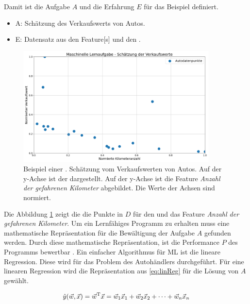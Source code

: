 Damit ist die Aufgabe \(A\) und die Erfahrung \(E\) für das Beispiel definiert. 

\begin{itemize}
    \item A: Schätzung des Verkaufswerts von Autos.
    \item E: Datensatz aus den \gls{Feature}[s] und den .
\end{itemize}

\begin{figure}[htb]
    \centering
    \includegraphics[width=0.9\textwidth]{img/Autohändlerbsp/Schätzung der Verkaufswerte.png}
    \caption[Beispiel einer maschinellen Lernaufgabe.]{Beispiel einer . Schätzung vom Verkaufswerten von Autos. Auf der y-Achse ist der  dargestellt. Auf der y-Achse ist die \gls{Feature} \textit{Anzahl der gefahrenen Kilometer} abgebildet. Die Werte der Achsen sind normiert.}
    \label{fig:BspMLAuto}
\end{figure}


Die Abbildung \ref{fig:BspMLAuto} zeigt die die Punkte in \(D\) für den  und das \gls{Feature} \textit{Anzahl der gefahrenen Kilometer}. Um ein Lernfähiges Programm zu erhalten muss eine mathematische Repräsentation für die Bewältigung der Aufgabe \(A\) gefunden werden. Durch diese mathematische Repräsentation, ist die Performance \(P\) des Programms bewertbar \cite{Mitchell.1997}. Ein einfacher Algorithmus für \gls{ML} ist die lineare Regression. Diese wird für das Problem des Autohändlers durchgeführt. Für eine linearen Regression wird die Repräsentation aus \autoref{eq:linReg} für die Lösung von \(A\) gewählt.

\begin{equation}
    \label{eq:linReg}
    \hat{y}(\vec{w}, \vec{x}) =  \vec{w}^\mathrm{T}\vec{x} = \vec{w}_1\vec{x}_1 + \vec{w}_2\vec{x}_2 + \dots + \vec{w}_n\vec{x}_n
\end{equation}

